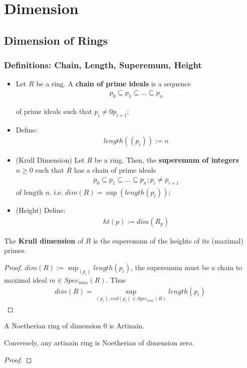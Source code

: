\documentclass[Total.tex]{subfiles}
\begin{document}
	\chapter{Dimension}
		\section{Dimension of Rings}
			\subsection{Definitions: Chain, Length, Superemum, Height}
			\begin{Def}
				\begin{itemize}
					\item Let $R$ be a ring. A \textbf{chain of prime ideals} is a sequence
					\begin{gather*}
						p_0\subseteq p_1\subseteq \dots\subseteq p_n
					\end{gather*}
					
					of prime ideals such that $p_i\not=0 p_{i+1}$;
					\item Define:
					\begin{gather*}
						length((p_i)):=n
					\end{gather*}
					\item (Krull Dimension) Let $R$ be a ring. Then, the \textbf{superemum of integers} $n\geq 0$ such that $R$ has a chain of prime ideals
					\begin{gather*}
						p_0\subseteq p_1\subseteq \dots\subseteq p_n;p_i\not=p_{i+1}
					\end{gather*}
					of length $n$. i.e. $dim(R)=\sup(length(p_i))$;
					\item (Height) Define:
					\begin{gather*}
						ht(p):=dim(R_p)
					\end{gather*}
				\end{itemize}
			\end{Def}
			\begin{lemma}
				The \textbf{Krull dimension} of $R$ is the superemum of the heights of its (maximal) primes.
			\end{lemma}
			\begin{proof}
				$dim(R):=\sup_{(p_i)}{length(p_i)}$, the superemum must be a chain to maximal ideal $m\in Spec_{max}(R)$. Thus
				\begin{gather*}
					dim(R)=\sup_{(p_i),end(p_i)\in Spec_{max}(R)} length(p_i)
				\end{gather*}
			\end{proof}
			\begin{lemma}
				A Noetherian ring of dimension $0$ is Artinain. 
				
				Conversely, any artinain ring is Noetherian of dimension zero.
			\end{lemma}
			\begin{proof}
				
			\end{proof}
			
\end{document}
